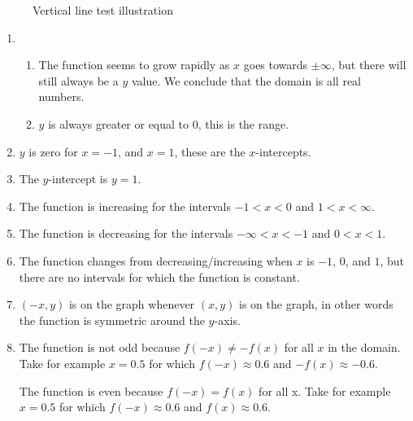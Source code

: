 \documentclass[11pt, letterpaper, oneside]{memoir}
\begin{document}
\begin{figure}[H]
  \centering
  \caption{Vertical line test illustration}
  \label{figure:exercise-1.1.29-vertical-line-test}
\end{figure}

\begin{enumerate}[label=(\alph*)]
  \item
    \begin{enumerate}[label=\roman*]
      \item The function seems to grow rapidly as $ x $ goes towards $ \pm\infty $, but there will still always be a $ y $ value. We conclude that the domain is all real numbers.
      \item $ y $ is always greater or equal to $ 0 $, this is the range.
    \end{enumerate}
  \item $ y $ is zero for $ x = -1 $, and $ x = 1 $, these are the $ x $-intercepts.
  \item The $ y $-intercept is $ y = 1 $.
  \item The function is increasing for the intervals $ -1 < x < 0 $ and $ 1 < x < \infty $.
  \item The function is decreasing for the intervals $ -\infty < x < -1 $ and $ 0 < x < 1 $.
  \item The function changes from decreasing/increasing when $ x $ is $ -1 $, $ 0 $, and $ 1 $, but there are no intervals for which the function is constant.
  \item $ (-x, y) $ is on the graph whenever $ (x, y) $ is on the graph, in other words the function is symmetric around the $ y $-axis.
  \item The function is not odd because $ f(-x) \neq -f(x) $ for all $ x $ in the domain. Take for example $ x = 0.5 $ for which $ f(-x) \approx 0.6 $ and $ -f(x) \approx - 0.6 $.

    The function is even because $ f(-x) = f(x) $ for all x. Take for example  $ x = 0.5 $ for which $ f(-x) \approx 0.6 $ and $ f(x) \approx 0.6 $.
\end{enumerate}
\end{document}
